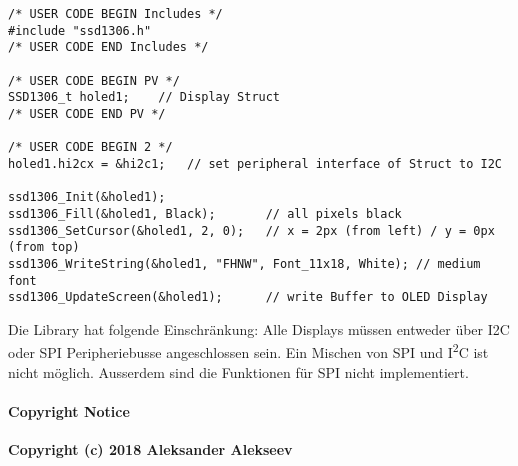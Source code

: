 \begin{lstlisting}[style=Cuvision, caption={Initialisierung und Anwendung der SSD1306 Library}]
/* USER CODE BEGIN Includes */
#include "ssd1306.h"
/* USER CODE END Includes */

/* USER CODE BEGIN PV */
SSD1306_t holed1;    // Display Struct
/* USER CODE END PV */

/* USER CODE BEGIN 2 */
holed1.hi2cx = &hi2c1;   // set peripheral interface of Struct to I2C

ssd1306_Init(&holed1);
ssd1306_Fill(&holed1, Black);       // all pixels black
ssd1306_SetCursor(&holed1, 2, 0);   // x = 2px (from left) / y = 0px (from top)
ssd1306_WriteString(&holed1, "FHNW", Font_11x18, White); // medium font
ssd1306_UpdateScreen(&holed1);      // write Buffer to OLED Display
\end{lstlisting}

Die Library hat folgende Einschränkung: Alle Displays müssen entweder über I2C oder SPI Peripheriebusse angeschlossen sein.
Ein Mischen von SPI und I\textsuperscript{2}C ist nicht möglich. Ausserdem sind die Funktionen für SPI nicht implementiert.

\paragraph{Copyright Notice}

\textbf{Copyright (c) 2018 Aleksander Alekseev}\
\
\
